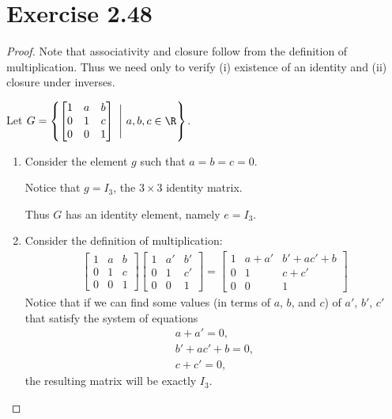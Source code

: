 \documentclass{article}
\begin{document}
\section*{Exercise 2.48}
\begin{proof} Note that associativity and closure follow from the definition of multiplication. Thus we need only to verify (i) existence of an identity and (ii) closure under inverses.

Let \(G=\left\{\begin{bmatrix}
    1 & a & b \\
    0 & 1 & c \\
    0 & 0 & 1
\end{bmatrix}\ \Bigg{\vert} \ a,b,c\in\R\right\}\).
\begin{enumerate}[label=(\roman*)]
    \item Consider the element \(g\) such that \(a = b = c = 0\).

    Notice that \(g = I_3\), the \(3\times 3\) identity matrix.

    Thus \(G\) has an identity element, namely \(e=I_3\).

    \item Consider the definition of multiplication:
    \begin{align*}
        \begin{bmatrix}
            1 & a & b \\
            0 & 1 & c \\
            0 & 0 & 1
        \end{bmatrix}
        \begin{bmatrix}
            1 & a' & b' \\
            0 & 1  & c' \\
            0 & 0  & 1
        \end{bmatrix}=
        \begin{bmatrix}
            1 & a + a' & b' + ac' + b \\
            0 & 1      & c + c' \\
            0 & 0      & 1
        \end{bmatrix}
    \end{align*}
    Notice that if we can find some values (in terms of \(a\), \(b\), and \(c\)) of \(a'\), \(b'\), \(c'\) that satisfy the system of equations \begin{align}
        a + a' = 0, \label{aa'}\\
        b' + ac' + b = 0, \\
        c + c' = 0, \label{cc'}
    \end{align}
    the resulting matrix will be exactly \(I_3\).


\end{enumerate}
\end{proof}
\end{document}
